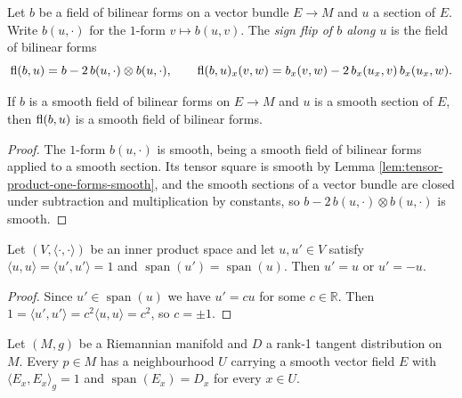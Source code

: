 \begin{definition}
\label{def:sign-flipped-form}
\leanok
{}
Let $b$ be a field of bilinear forms on a vector bundle $E \to M$ and $u$ a section of $E$. Write $b(u,\cdot)$ for the $1$-form $v \mapsto b(u,v)$. The \emph{sign flip of $b$ along $u$} is the field of bilinear forms
\[
  \operatorname{fl}(b,u) = b - 2\, b(u,\cdot) \otimes b(u,\cdot), \qquad \operatorname{fl}(b,u)_x(v,w) = b_x(v,w) - 2\,b_x(u_x,v)\,b_x(u_x,w).
\]
\end{definition}

\begin{lemma}
\label{lem:sign-flipped-form-smooth}
\leanok
{}
If $b$ is a smooth field of bilinear forms on $E \to M$ and $u$ is a smooth section of $E$, then $\operatorname{fl}(b,u)$ is a smooth field of bilinear forms.
\end{lemma}

\begin{proof}
\leanok
{}
The $1$-form $b(u,\cdot)$ is smooth, being a smooth field of bilinear forms applied to a smooth section. Its tensor square is smooth by Lemma \ref{lem:tensor-product-one-forms-smooth}, and the smooth sections of a vector bundle are closed under subtraction and multiplication by constants, so $b - 2\,b(u,\cdot)\otimes b(u,\cdot)$ is smooth.
\end{proof}

\begin{lemma}
\label{lem:two-unit-vectors-of-a-line}
\leanok
Let $(V, \langle\cdot,\cdot\rangle)$ be an inner product space and let $u, u' \in V$ satisfy $\langle u,u\rangle = \langle u',u'\rangle = 1$ and $\operatorname{span}(u') = \operatorname{span}(u)$. Then $u' = u$ or $u' = -u$.
\end{lemma}

\begin{proof}
\leanok
Since $u' \in \operatorname{span}(u)$ we have $u' = cu$ for some $c \in \mathbb{R}$. Then $1 = \langle u',u'\rangle = c^2\langle u,u\rangle = c^2$, so $c = \pm 1$.
\end{proof}

\begin{lemma}
\label{lem:local-unit-section}
\leanok
{}
Let $(M,g)$ be a Riemannian manifold and $D$ a rank-1 tangent distribution on $M$. Every $p \in M$ has a neighbourhood $U$ carrying a smooth vector field $E$ with $\langle E_x, E_x\rangle_g = 1$ and $\operatorname{span}(E_x) = D_x$ for every $x \in U$.
\end{lemma}

